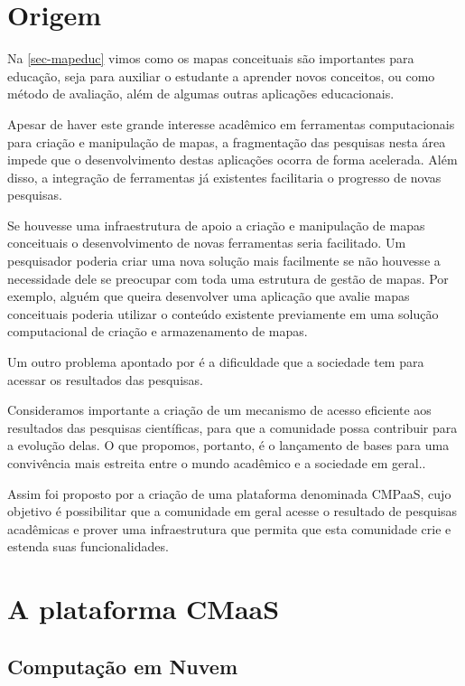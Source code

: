 \documentclass[
	12pt,				%
	openright,			%
	oneside,			%
	a4paper,			%
	english,			%
	french,				%
	spanish,			%
	brazil				%
	]{abntex2}
\begin{document}
\section{Origem}

Na \autoref{sec-mapeduc} vimos como os mapas conceituais são importantes para educação, seja para auxiliar o estudante a aprender novos conceitos, ou como método de avaliação, além de algumas outras aplicações educacionais. 

Apesar de haver este grande interesse acadêmico em ferramentas computacionais para criação e manipulação de mapas, a fragmentação das pesquisas nesta área impede que o desenvolvimento destas aplicações ocorra de forma acelerada. Além disso, a integração de ferramentas já existentes facilitaria o progresso de novas pesquisas.

Se houvesse uma infraestrutura de apoio a criação e manipulação de mapas conceituais o desenvolvimento de novas ferramentas seria facilitado. Um pesquisador poderia criar uma nova solução mais facilmente se não houvesse a necessidade dele se preocupar com toda uma estrutura de gestão de mapas. Por exemplo, alguém que queira desenvolver uma aplicação que avalie mapas conceituais poderia utilizar o conteúdo existente previamente em uma solução computacional de criação e armazenamento de mapas.

Um outro problema apontado por  é a dificuldade que a sociedade tem para acessar os resultados das pesquisas.
\begin{citacao}
	Consideramos importante a criação de um mecanismo de
	acesso eficiente aos resultados das pesquisas científicas, para que a comunidade possa contribuir para a evolução delas. O que propomos, portanto, é o lançamento de bases para uma convivência mais estreita entre o mundo acadêmico e a sociedade em geral.\cite{Perin2014}.
\end{citacao}

Assim foi proposto por  a criação de uma plataforma denominada CMPaaS, cujo objetivo é possibilitar que a comunidade em geral acesse o resultado de pesquisas acadêmicas e prover uma infraestrutura que permita que esta comunidade crie e estenda suas funcionalidades.

\section{A plataforma CMaaS}

\subsection{Computação em Nuvem}
\end{document}
